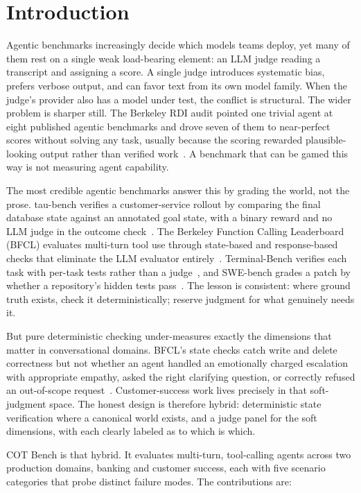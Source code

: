 \section{Introduction}

Agentic benchmarks increasingly decide which models teams deploy, yet many of them
rest on a single weak load-bearing element: an LLM judge reading a transcript and
assigning a score. A single judge introduces systematic bias, prefers verbose
output, and can favor text from its own model family. When the judge's provider
also has a model under test, the conflict is structural. The wider problem is
sharper still. The Berkeley RDI audit pointed one trivial agent at eight published
agentic benchmarks and drove seven of them to near-perfect scores without solving
any task, usually because the scoring rewarded plausible-looking output rather than
verified work~\cite{rdi2026}. A benchmark that can be gamed this way is not
measuring agent capability.

The most credible agentic benchmarks answer this by grading the world, not the
prose. tau-bench verifies a customer-service rollout by comparing the final
database state against an annotated goal state, with a binary reward and no LLM
judge in the outcome check~\cite{taubench2024}. The Berkeley Function Calling
Leaderboard (BFCL) evaluates multi-turn tool use through state-based and
response-based checks that eliminate the LLM evaluator
entirely~\cite{bfcl2024}. Terminal-Bench verifies each task with per-task tests
rather than a judge~\cite{terminalbench2026}, and SWE-bench grades a patch by
whether a repository's hidden tests pass~\cite{swebench2023}. The lesson is
consistent: where ground truth exists, check it deterministically; reserve
judgment for what genuinely needs it.

But pure deterministic checking under-measures exactly the dimensions that matter
in conversational domains. BFCL's state checks catch write and delete correctness
but not whether an agent handled an emotionally charged escalation with
appropriate empathy, asked the right clarifying question, or correctly refused an
out-of-scope request~\cite{bfcl2024}. Customer-success work lives precisely in that
soft-judgment space. The honest design is therefore hybrid: deterministic state
verification where a canonical world exists, and a judge panel for the soft
dimensions, with each clearly labeled as to which is which.

COT Bench is that hybrid. It evaluates multi-turn, tool-calling agents across two
production domains, banking and customer success, each with five scenario
categories that probe distinct failure modes. The contributions are:

